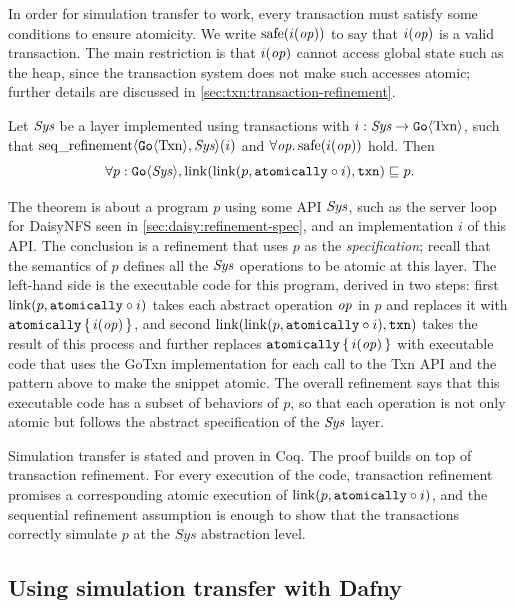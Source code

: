 In order for simulation transfer to work, every transaction must satisfy some
conditions to ensure atomicity. We write $\mathrm{safe}(i(\mathit{op}))$ to say that $i(\mathit{op})$ is a
valid transaction. The main restriction is that $i(\mathit{op})$ cannot access global state
such as the heap, since the transaction system does not make such accesses
atomic; further details are discussed in \cref{sec:txn:transaction-refinement}.

\begin{theorem}
  Let $\textit{Sys}$ be a layer implemented using transactions with
$i : \textit{Sys} \to \mathtt{Go}\langle \mathrm{Txn} \rangle$, such that
$\operatorname{seq\_refinement}\langle \mathtt{Go}\langle \mathrm{Txn} \rangle, \textit{Sys} \rangle(i)$ and
$\forall \mathit{op}.\, \mathrm{safe}(i(\mathit{op}))$ hold. Then
\[
  \forall p : \mathtt{Go}\langle \mathit{Sys} \rangle, \mathrm{link}(\mathrm{link}(p, \mathtt{atomically}\circ i), \texttt{txn}) \sqsubseteq p.
\]
\label{thm:gotxn-transfer}
\end{theorem}
\nopagebreak

The theorem is about a program $p$ using some API $\mathit{Sys}$, such as the server
loop for DaisyNFS seen in \cref{sec:daisy:refinement-spec}, and an
implementation $i$ of this API.\@
The conclusion is a refinement that uses $p$ as the \emph{specification}; recall
that the semantics of $p$ defines all the $\mathit{Sys}$ operations to be atomic at this
layer. The left-hand side is the executable code for this program, derived in
two steps: first $\mathrm{link}(p, \mathtt{atomically}\circ i)$ takes each abstract operation
$\mathit{op}$ in $p$ and replaces it with $\mathtt{atomically}\,\{\, i(\mathit{op}) \,\}$, and second
$\mathrm{link}(\mathrm{link}(p, \mathtt{atomically}\circ i), \texttt{txn})$ takes the result of this process and
further replaces $\mathtt{atomically}\,\{\, i(\mathit{op}) \,\}$ with executable code that uses the GoTxn
implementation for each call to the Txn API and the  pattern above to
make the snippet atomic. The overall refinement says that this executable code
has a subset of behaviors of $p$, so that each operation is not only atomic but
follows the abstract specification of the $\mathit{Sys}$ layer.

Simulation transfer is stated and proven in Coq. The proof builds on top of
transaction refinement. For every execution of the code, transaction refinement promises
a corresponding atomic execution of $\mathrm{link}(p, \mathtt{atomically}\circ i)$, and the
sequential refinement assumption is enough to show that the transactions
correctly simulate $p$ at the $\mathit{Sys}$ abstraction level.

\subsection{Using simulation transfer with Dafny}%
\label{sec:daisy:proof-dafny}


